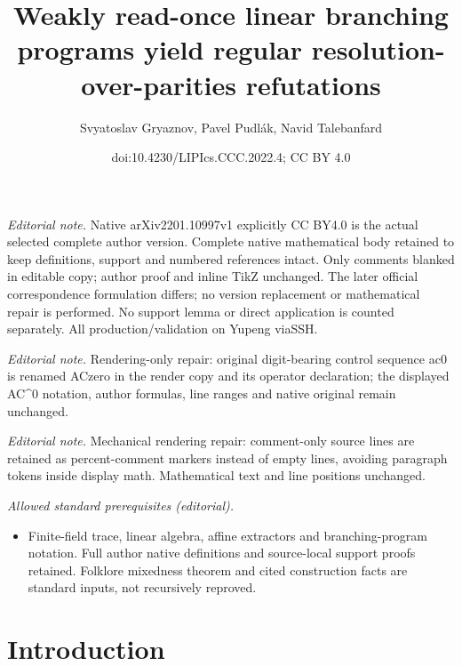 \documentclass[10pt,a4paper]{article}
\title{Weakly read-once linear branching programs yield regular resolution-over-parities refutations}
\author{Svyatoslav Gryaznov, Pavel Pudlák, Navid Talebanfard}
\date{doi:10.4230/LIPIcs.CCC.2022.4; CC BY 4.0}
\theoremstyle{definition}
\theoremstyle{remark}
\begin{document}
\maketitle
\noindent\textit{Editorial note.} Native arXiv2201.10997v1 explicitly CC BY4.0 is the actual selected complete author version. Complete native mathematical body retained to keep definitions, support and numbered references intact. Only comments blanked in editable copy; author proof and inline TikZ unchanged. The later official correspondence formulation differs; no version replacement or mathematical repair is performed. No support lemma or direct application is counted separately. All production/validation on Yupeng viaSSH.\par\medskip
\noindent\textit{Editorial note.} Rendering-only repair: original digit-bearing control sequence ac0 is renamed ACzero in the render copy and its operator declaration; the displayed AC\textasciicircum{}0 notation, author formulas, line ranges and native original remain unchanged.\par\medskip
\noindent\textit{Editorial note.} Mechanical rendering repair: comment-only source lines are retained as percent-comment markers instead of empty lines, avoiding paragraph tokens inside display math. Mathematical text and line positions unchanged.\par\medskip
\noindent\textit{Allowed standard prerequisites (editorial).}\begin{itemize}
\item Finite-field trace, linear algebra, affine extractors and branching-program notation. Full author native definitions and source-local support proofs retained. Folklore mixedness theorem and cited construction facts are standard inputs, not recursively reproved.
\end{itemize}\medskip
\section{Introduction}
\end{document}
